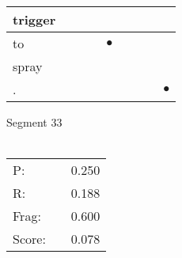 \documentclass[landscape]{article}
\newcommand{\ssp}{\hspace{2pt}}
\newcommand{\mex}{\cellcolor{g}$\bullet$}
\begin{document}
\begin{tabular}{|l|p{10pt}|p{10pt}|p{10pt}|p{10pt}|p{10pt}|p{10pt}|p{10pt}|p{10pt}|}
\hline
\ssp trigger \ssp&\hspace{2pt}&\hspace{2pt}&\hspace{2pt}&\hspace{2pt}&\hspace{2pt}&\hspace{2pt}&\hspace{2pt}&\hspace{2pt}\\
\hline
\ssp \cellcolor{ref3}to \ssp&\hspace{2pt}&\hspace{2pt}&\hspace{2pt}&\hspace{2pt}\mex&\hspace{2pt}&\hspace{2pt}&\hspace{2pt}&\hspace{2pt}\\
\hline
\ssp spray \ssp&\hspace{2pt}&\hspace{2pt}&\hspace{2pt}&\hspace{2pt}&\hspace{2pt}&\hspace{2pt}&\hspace{2pt}&\hspace{2pt}\\
\hline
\ssp \cellcolor{ref7}. \ssp&\hspace{2pt}&\hspace{2pt}&\hspace{2pt}&\hspace{2pt}&\hspace{2pt}&\hspace{2pt}&\hspace{2pt}&\hspace{2pt}\mex\\
\hline
\end{tabular}

\vspace{6pt}
\noindent Segment 33\\\\
\noindent\begin{tabular}{lm{12pt}r}
\hline
P:&&0.250\\
R:&&0.188\\
Frag:&&0.600\\
Score:&&0.078\\
\end{tabular}
\end{document}
